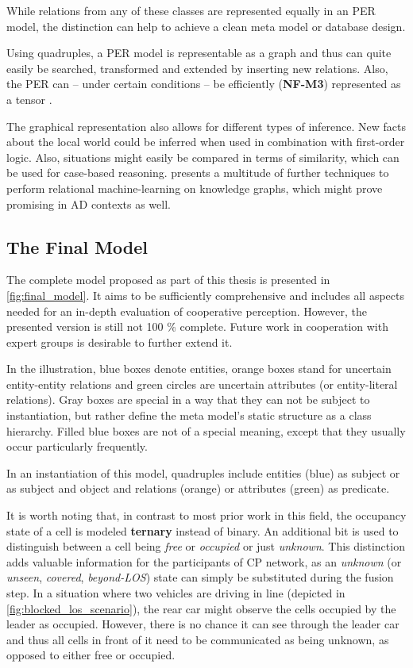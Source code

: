 While relations from any of these classes are represented equally in an PER model, the distinction can help to achieve a clean meta model or database design.
\par
\bigskip

Using quadruples, a PER model is representable as a graph and thus can quite easily be searched, transformed and extended by inserting new relations. Also, the PER can – under certain conditions – be efficiently (\textbf{NF-M3}) represented as a tensor \cite{Petrich2018}.

The graphical representation also allows for different types of inference. New facts about the local world could be inferred when used in combination with first-order logic. Also, situations might easily be compared in terms of similarity, which can be used for case-based reasoning. \cite{Nickel2016} presents a multitude of further techniques to perform relational machine-learning on knowledge graphs, which might prove promising in AD contexts as well. 

\subsection{The Final Model}
\label{subsec:concept_design:the_final_model}
The complete model proposed as part of this thesis is presented in \autoref{fig:final_model}. It aims to be sufficiently comprehensive and includes all aspects needed for an in-depth evaluation of cooperative perception. However, the presented version is still not 100 \% complete. Future work in cooperation with expert groups is desirable to further extend it. 

In the illustration, blue boxes denote entities, orange boxes stand for uncertain entity-entity relations and green circles are uncertain attributes (or entity-literal relations). Gray boxes are special in a way that they can not be subject to instantiation, but rather define the meta model's static structure as a class hierarchy. Filled blue boxes are not of a special meaning, except that they usually occur particularly frequently.

In an instantiation of this model, quadruples include entities (blue) as subject or as subject and object and relations (orange) or attributes (green) as predicate. 

It is worth noting that, in contrast to most prior work in this field, the occupancy state of a cell is modeled \textbf{ternary} instead of binary. An additional bit is used to distinguish between a cell being \textit{free} or \textit{occupied} or just \textit{unknown}. This distinction adds valuable information for the participants of CP network, as an  \textit{unknown} (or \textit{unseen}, \textit{covered}, \textit{beyond-LOS}) state can simply be substituted during the fusion step. In a situation where two vehicles are driving in line (depicted in \autoref{fig:blocked_los_scenario}), the rear car might observe the cells occupied by the leader as occupied. However, there is no chance it can see through the leader car and thus all cells in front of it need to be communicated as being unknown, as opposed to either free or occupied.

